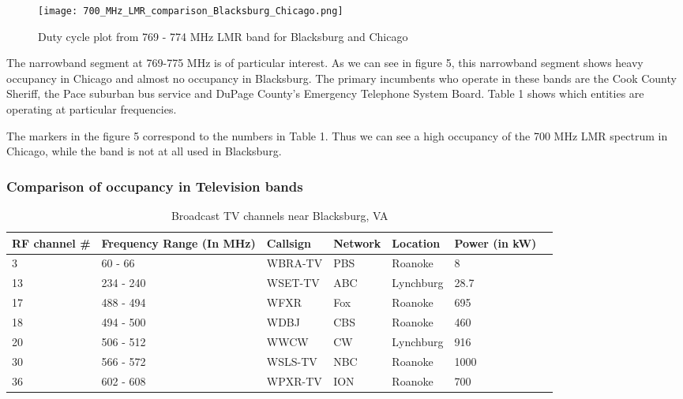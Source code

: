\documentclass[12pt,sts]{report}
\begin{document}
	\begin{figure}[ht!]
		\centering
			\texttt{[image: 700\_MHz\_LMR\_comparison\_Blacksburg\_Chicago.png]}
		\caption{Duty cycle plot from 769 - 774 MHz LMR band for Blacksburg and Chicago}
	\end{figure}
	
	The narrowband segment at 769-775 MHz is of particular interest. As we can see in figure 5, this narrowband segment shows heavy occupancy in Chicago and almost no occupancy in Blacksburg. The primary incumbents who operate in these bands are the Cook County Sheriff, the Pace suburban bus service and DuPage County's Emergency Telephone System Board. Table 1 shows which entities are operating at particular frequencies.
	
	The markers in the figure 5 correspond to the numbers in Table 1. Thus we can see a high occupancy of the 700 MHz LMR spectrum in Chicago, while the band is not at all used in Blacksburg.
	
	\subsubsection{Comparison of occupancy in Television bands}
	
	\begin{table}[h!]
		\begin{tabular}{| p{2cm} | p{2cm} | p{3cm} | p{2cm} | p{2cm} | p{2cm} | p{2cm} |}
		\hline
		RF channel \#	& Frequency Range (In MHz)	& Callsign 	& Network & Location & Power (in kW) \\	\hline
		
		3 & 60 - 66 & WBRA-TV & PBS & Roanoke & 8 \\ \hline
		13 & 234 - 240 & WSET-TV &	ABC & Lynchburg	& 28.7 \\ \hline
		17 & 488 - 494 & WFXR & Fox & Roanoke & 695 \\ \hline
		18 & 494 - 500 & WDBJ & CBS &	Roanoke &	460 \\	\hline
		20 & 506 - 512 & WWCW & CW & Lynchburg	&	916 \\	\hline
		30 & 566 - 572 &	WSLS-TV &	NBC &	Roanoke & 1000 \\	\hline
		36 & 602 - 608 & WPXR-TV & ION & Roanoke & 700 \\
		\hline
		\end{tabular}
		\caption{Broadcast TV channels near Blacksburg, VA}
	\end{table}
	
\end{document}
